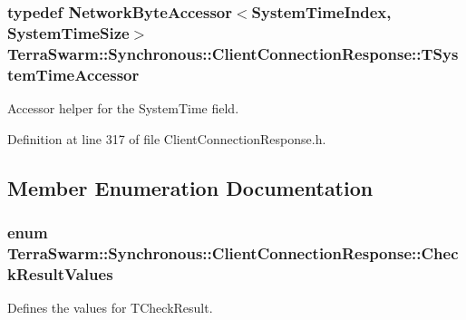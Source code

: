 \hypertarget{class_terra_swarm_1_1_synchronous_1_1_client_connection_response_ad4b8d0ca4f4c2bbb9cfc704e6b250e57}{
\subsubsection[{T\-System\-Time\-Accessor}]{\setlength{\rightskip}{0pt plus 5cm}typedef {\bf Network\-Byte\-Accessor}$<${\bf System\-Time\-Index}, {\bf System\-Time\-Size}$>$ {\bf Terra\-Swarm\-::\-Synchronous\-::\-Client\-Connection\-Response\-::\-T\-System\-Time\-Accessor}\hspace{0.3cm}{\ttfamily [private]}}}\label{class_terra_swarm_1_1_synchronous_1_1_client_connection_response_ad4b8d0ca4f4c2bbb9cfc704e6b250e57}


Accessor helper for the System\-Time field. 



Definition at line 317 of file Client\-Connection\-Response.\-h.



\subsection{Member Enumeration Documentation}
\hypertarget{class_terra_swarm_1_1_synchronous_1_1_client_connection_response_a915e4d4af1f35e3de466d27d42c57d78}{
\subsubsection[{Check\-Result\-Values}]{\setlength{\rightskip}{0pt plus 5cm}enum {\bf Terra\-Swarm\-::\-Synchronous\-::\-Client\-Connection\-Response\-::\-Check\-Result\-Values}}}\label{class_terra_swarm_1_1_synchronous_1_1_client_connection_response_a915e4d4af1f35e3de466d27d42c57d78}


Defines the values for T\-Check\-Result. 

